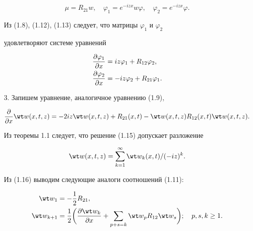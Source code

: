 \begin{equation} 


\mu=R_{21}w,\quad \varphi_1=e^{-izx}w\varphi,\quad 


\varphi_2=e^{-izx}\varphi. 


\end{equation} 


Из (1.8), (1.12), (1.13) следует, что матрицы $\varphi_1$ и $\varphi_2$ 


удовлетворяют системе уравнений 


\begin{equation} 




\begin{split} 


\myfrac{\varphi_1}{x}&=iz\varphi_1+R_{12}\varphi_2,\\ 


\myfrac{\varphi_2}{x}&=-iz\varphi_2+R_{21}\varphi_1. 


\end{split} 




\end{equation} 


 


3. Запишем уравнение, аналогичное уравнению (1.9),


\begin{equation} 


\myfrac{}{x}\wt w(x,t,z)=-2iz\wt w(x,t,z)+R_{21}(x,t)- 


\wt w(x,t,z)R_{12}(x,t)\wt w(x,t,z). 


\end{equation} 


Из теоремы 1.1 следует, что решение (1.15) допускает разложение 


\begin{equation} 


\wt w(x,t,z)=\sum^\infty_{k=1}\wt w_k(x,t)/(-iz)^k. 


\end{equation} 


Из (1.16) выводим следующие аналоги соотношений (1.11): 


\begin{align} 


\wt w_1&=-\frac{1}{2}R_{21},\\ 


\wt w_{k+1}&=\frac{1}{2}\bigg(\myfrac{\wt w_k}{x}+ 


\sum_{p+s=k}\wt w_p R_{12}\wt w_s\bigg);\quad p,s,k\ge 1. 


\end{align} 


